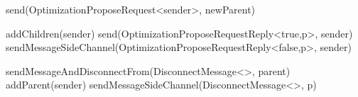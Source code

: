 \begin{algorithm}
\begin{algorithmic}[1]
         \label{alg:memb:active_view_maint:opt_propose_recv}
                \State send(OptimizationProposeRequest<sender>, newParent)
            \EndIf
        \asdend

         \label{alg:memb:active_view_maint:opt_propose_req_recv}
             
                \State addChildren(sender)
                \State send(OptimizationProposeRequestReply<true,p>, sender)
            \Else
                \State sendMessageSideChannel(OptimizationProposeRequestReply<false,p>, sender)
            \EndIf
        \asdend

         \label{alg:memb:active_view_maint:opt_propose_req_reply_recv}
                    \State sendMessageAndDisconnectFrom(DisconnectMessage<>, parent)
                    \State addParent(sender)
                \EndIf
            \Else
                \State sendMessageSideChannel(DisconnectMessage<>, p)
            \EndIf
        \asdend

    \end{algorithmic}
\end{algorithm}